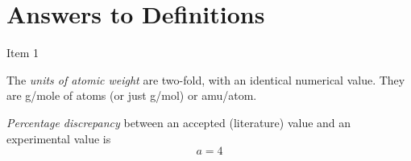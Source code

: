 \documentclass{article}
\begin{document}
\section{Answers to Definitions}

\begin{enumerate}
\begin{item}
  Item 1
\end{item}
\begin{item}
The \emph{units of atomic weight} are two-fold, with an identical numerical value. They are g/mole of atoms (or just g/mol) or amu/atom.
\end{item}
\begin{item}
\emph{Percentage discrepancy} between an accepted (literature) value and an experimental value is
\begin{equation*}
  a = 4
\end{equation*}
\end{item}
\end{enumerate}
\end{document}
